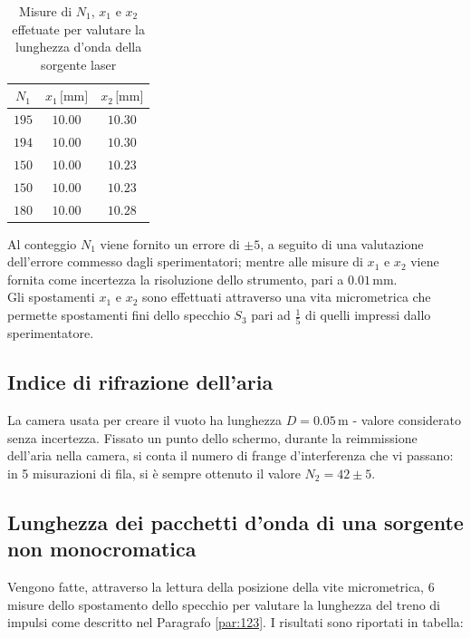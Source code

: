 \documentclass[]{article}
\let\oldsubsection\subsection%
\renewcommand{\subsection}{%
	\renewcommand{\theequation}{\thesubsection.\arabic{equation}}%
	\oldsubsection}%
\begin{document}
\begin{table}[H]
    \centering

    \begin{tabular}{||c|c|c||}
        \hline
        $N_1 $ & $x_1 \, \text{[mm]}$ & $x_2\, \text{[mm]}$ \\
        \hline\hline

        $195$ & $10.00$ & $10.30$ \\\hline
        $194$ & $10.00$ & $10.30$ \\\hline
        $150$ & $10.00$ & $10.23$ \\\hline
        $150$ & $10.00$ & $10.23$ \\\hline
        $180$ & $10.00$ & $10.28$ \\\hline
    
    \end{tabular}
    \caption{Misure di $N_1$, $x_1$ e $x_2$ effetuate per valutare la lunghezza d'onda della sorgente laser}
    \label{lambda}    
\end{table}
Al conteggio $N_1$ viene fornito un errore di $ \pm 5$, a seguito di una valutazione dell'errore commesso dagli sperimentatori; mentre alle misure di $x_1$ e $x_2$ viene fornita come incertezza la risoluzione dello strumento, pari a $0.01 \, \text{mm}$. \\ Gli spostamenti $x_1$ e $x_2$ sono effettuati attraverso una vita micrometrica che permette spostamenti fini dello specchio $S_3$ pari ad $\frac{1}{5}$ di quelli impressi dallo sperimentatore. 


\subsection{Indice di rifrazione dell'aria}
\label{par:n_a}

La camera usata per creare il vuoto ha lunghezza $D=0.05 \, \text{m}$ - valore considerato senza incertezza. Fissato un punto dello schermo, durante la reimmissione dell'aria nella camera, si conta il numero di frange d'interferenza che vi passano: in 5 misurazioni di fila, si è sempre ottenuto il valore $N_2 = 42 \pm 5$.

\subsection{Lunghezza dei pacchetti d'onda di una sorgente non monocromatica}

Vengono fatte, attraverso la lettura della posizione della vite micrometrica, 6 misure dello spostamento dello specchio per valutare la lunghezza del treno di impulsi come descritto nel Paragrafo \ref{par:123}. I risultati sono riportati in tabella:
\end{document}
